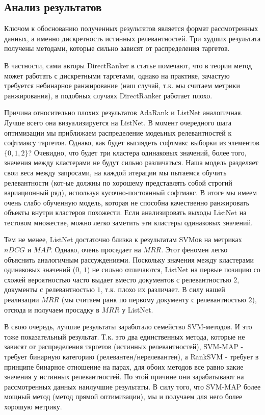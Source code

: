 \documentclass{article}[16pt]
\begin{document}
	\subsection{Анализ результатов}
	Ключом к обоснованию полученных результатов является формат рассмотренных данных, а именно дискретность истинных релевантностей. Три худших результата получены методами, которые сильно зависят от распределения таргетов. 
	
	В частности, сами авторы DirectRanker в статье помечают, что в теории метод может работать с дискретными таргетами, однако на практике, зачастую требуется небинарное ранжирование (наш случай, т.к. мы считаем метрики ранжирования), в подобных случаях DirectRanker работает плохо. 
	
	Причина относительно плохих результатов AdaRank и ListNet аналогичная. Лучше всего она визуализируется на ListNet. В момент очередного шага оптимизации мы приближаем распределение модеьных релевантностей к софтмаксу таргетов. Однако, как будет выглядеть софтмакс выборки из элементов $\{0, 1, 2\}$? Очевидно, что будет три кластера одинаковых значений, более того, значения между кластерами не будут сильно различаться. Наша модель разделяет свои веса между запросами, на каждой итерации мы пытаемся обучить релевантности (кот-ые должны по хорошему представлять собой строгий вариационный ряд), используя кусочно-постоянный софтмакс. В итоге мы имеем очень слабо обученную модель, которая не способна качественно ранжировать объекты внутри кластеров похожести. Если анализировать выходы ListNet на тестовом множестве, можно легко заметить эти кластеры одинаковых значений. 
	
	Тем не менее, ListNet достаточно близка к результатам SVMов на метриках $nDCG$ и $MAP$. Однако, очень проседает на $MRR$. Этот феномен легко объяснить аналогичным рассуждениями. Поскольку значения между кластерами одинаковых значений ($0$, $1$) не сильно отличаются, ListNet на первые позицию со схожей вероятностью часто выдает вместо документов с релевантностью $2$, документы с релевантностью $1$, т.к. плохо их различает. В силу нашей реализации $MRR$ (мы считаем ранк по первому документу с релевантностью $2$), отсюда и получаем просадку в $MRR$ у ListNet.
	
	В свою очередь, лучшие результаты заработало семейство SVM-методов. И это тоже показательный результат. Т.к. это два единственных метода, которые не зависят от распределения таргетов (истинных релевантностей), SVM-MAP - требует бинарную категорию (релевантен/нерелевантен), а RankSVM - требует в принципе бинарное отношение на парах, для обоих методов все равно какие значения у истинных релевантностей. По этой причине они зарабатывают на рассмотренных данных наилучшие результаты. В силу того, что SVM-MAP более мощный метод (метод прямой оптимизации), мы и получаем для него более хорошую метрику.
	
\end{document}
